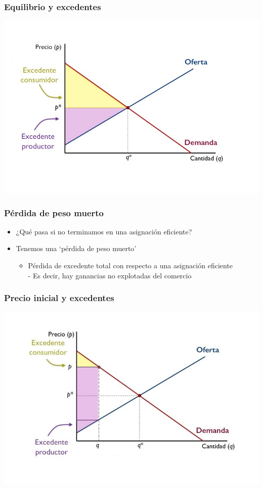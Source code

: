 \documentclass{beamer}
\begin{document}
\begin{frame}
\frametitle{Equilibrio y excedentes}
\begin{center}
\includegraphics[scale=0.5]{../Figures/Tema_07.23_newexcedentes.jpg}
\end{center}
\end{frame}

\begin{frame}
\frametitle{Pérdida de peso muerto}
\begin{itemize}
    \item ¿Qué pasa si no terminamos en una asignación eficiente? 
    \item Tenemos una ‘pérdida de peso muerto’
    \begin{itemize}
        \item Pérdida de excedente total con respecto a una asignación eficiente \\
        - Es decir, hay ganancias no explotadas del comercio
    \end{itemize}
    \end{itemize}
\end{frame}

\begin{frame}
\frametitle{Precio inicial y excedentes}
\includegraphics[scale=0.6]{../Figures/Tema_07.23_newexcedentes1.jpg}
\end{frame}
\end{document}
